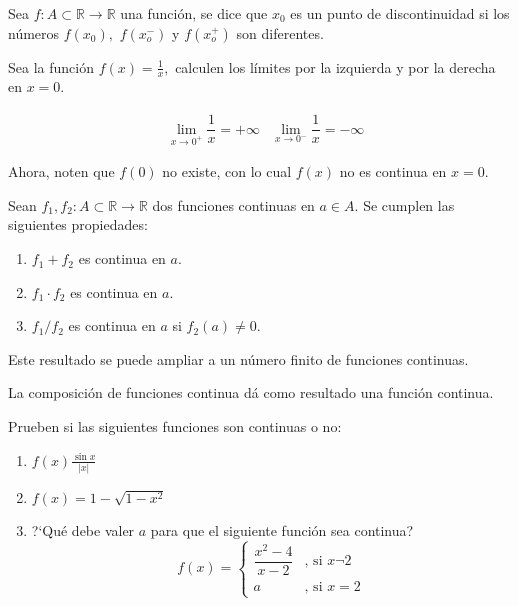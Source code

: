 	
\begin{definition}
		Sea \(f:A\subset\mathbb{R}\to\mathbb{R}\) una funci\'on, se dice que \(x_0\) es un punto de discontinuidad si los n\'umeros \(f(x_0),\) \(f(x_o^-)\) y \(f(x_o^+)\) son diferentes.
\end{definition}
	
	Sea la funci\'on \(f(x)=\frac{1}{x},\) calculen los l\'imites por la izquierda y por la derecha en \(x=0.\)
	
	\begin{align*}
	&\lim\limits_{x\to 0^+}\dfrac{1}{x}=+\infty&\lim\limits_{x\to 0^-}\dfrac{1}{x}=-\infty
	\end{align*}
	
	Ahora, noten que \(f(0)\) no existe, con lo cual \(f(x)\) no es continua en \(x=0.\)\newline
	
\begin{property}
	Sean \(f_1,f_2:A\subset\mathbb{R}\to \mathbb{R}\) dos funciones continuas en \(a\in A.\) Se cumplen las siguientes propiedades:
	\begin{enumerate}
		\item \(f_1+f_2\) es continua en \(a.\)
		\item \(f_1\cdot f_2\) es continua en \(a.\)
		\item \(f_1/f_2\) es continua en \(a\) si \(f_2(a)\neq 0.\)
	\end{enumerate}
	
	Este resultado se puede ampliar a un n\'umero finito de funciones continuas.
\end{property}

\begin{property}
	La composici\'on de funciones continua d\'a como resultado una funci\'on continua.
\end{property}

\begin{exercise}
	Prueben si las siguientes funciones son continuas o no:
	
	\begin{enumerate}
		\item \(f(x)\frac{\sin x}{\left|x\right|}\)
		\item \(f(x)=1-\sqrt{1-x^2}\)
		\item ?`Qu\'e debe valer \(a\) para que el siguiente funci\'on sea continua?
		\[
		f(x)=\begin{cases}
		\dfrac{x^2-4}{x-2}&\text{, si }x\neg 2\\
		a&\text{, si }x= 2
		\end{cases}
		\]
	\end{enumerate}
	
\end{exercise}

